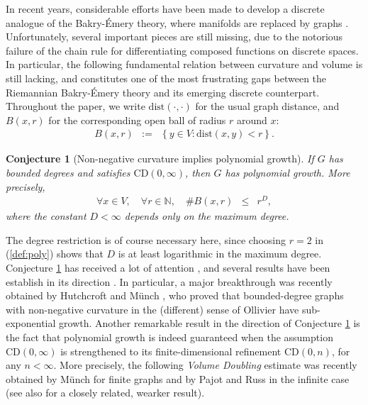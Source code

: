 \documentclass[10pt,a4paper]{amsart}
\newtheorem{conjecture}{Conjecture}
\newcommand{\dN}{\mathbb {N}}
\newcommand{\CD}{\mathrm{CD}}
\newcommand{\dist}{{\mathrm{dist}}}
\begin{document}
In recent years, considerable efforts have been made to develop a discrete analogue of the Bakry-\'Emery theory, where manifolds are replaced by graphs  \cite{MR1665591,MR2644381,MR3173151,MR3492631, MR3592766,MR3776357,MR3906157,MR4045968,MR4946365,MR4545901,MR4828188,salez2025intrinsicregularitydiscretelogsobolev}. Unfortunately, several important pieces   are still missing, due to the notorious failure of the chain rule for differentiating composed functions on discrete spaces. In particular, the following fundamental relation between curvature and volume is still lacking, and constitutes one of the most frustrating gaps between the Riemannian Bakry-\'Emery theory and its emerging discrete  counterpart. Throughout the paper, we write $\dist(\cdot,\cdot)$ for the usual graph distance, and  $B(x,r)$ for the corresponding open ball of radius $r$ around $x$: 
\begin{eqnarray}
B(x,r) & := & \left\{y\in V\colon \dist(x,y)<r\right\}. 
\end{eqnarray}
\begin{conjecture}[Non-negative curvature implies polynomial growth]\label{conj:main} If $G$ has bounded degrees and satisfies $\CD(0,\infty)$, then $G$ has polynomial growth. More precisely,
\begin{eqnarray}
\label{def:poly}
\forall x\in V,\quad \forall r\in \dN,\quad \# B(x,r) & \le & r^D,
\end{eqnarray}
where the constant $D<\infty$  depends only on the maximum degree. 
\end{conjecture}
The degree restriction is of course necessary here, since choosing $r=2$ in (\ref{def:poly}) shows that $D$ is at least logarithmic in the maximum degree. 
Conjecture \ref{conj:main} has received a lot of attention \cite{hua2017ricci,münch2019,russ2025}, and several results have been establish in its direction \cite{MR3316971,MR4536468,MR4567745,hutchcroft2025}. In particular, a major breakthrough was recently obtained by Hutchcroft  and M\"unch \cite{hutchcroft2025}, who proved that bounded-degree graphs with non-negative  curvature in the (different) sense of Ollivier \cite{MR2484937} have sub-exponential growth. Another remarkable result in the direction of Conjecture \ref{conj:main} is the fact that polynomial growth is indeed guaranteed when the assumption  $\CD(0,\infty)$ is strengthened to its finite-dimensional refinement $\CD(0,n)$, for any  $n<\infty$.  More precisely, the following \emph{Volume Doubling} estimate was recently obtained by Münch \cite{münch2019} for finite graphs and by Pajot and Russ \cite{russ2025} in the infinite case (see also \cite{MR3316971} for a closely related,  wearker result).
\end{document}
